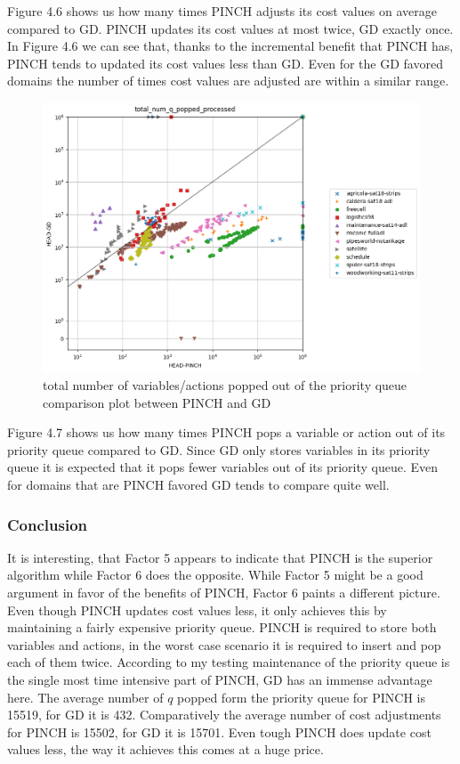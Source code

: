 Figure 4.6 shows us how many times PINCH adjusts its cost values on average compared to GD. PINCH updates its cost values at most twice, GD exactly once. In Figure 4.6 we can see that, thanks to the incremental benefit that PINCH has, PINCH tends to updated its cost values less than GD. Even for the GD favored domains the number of times cost values are adjusted are within a similar range.

\begin{figure}
    \centering
    \includegraphics[width=.7\columnwidth]{plotSearch.png}
    \caption{total number of variables/actions popped out of the priority queue comparison plot between PINCH and GD}
    \label{fig:my_label}
\end{figure}
Figure 4.7 shows us how many times PINCH pops a variable or action out of its priority queue compared to GD. Since GD only stores variables in its priority queue it is expected that it pops fewer variables out of its priority queue. Even for domains that are PINCH favored GD tends to compare quite well. 
\subsubsection{Conclusion}
It is interesting, that Factor 5 appears to indicate that PINCH is the superior algorithm while Factor 6 does the opposite. While Factor 5 might be a good argument in favor of the benefits of PINCH, Factor 6 paints a different picture. Even though PINCH updates cost values less, it only achieves this by maintaining a fairly expensive priority queue. PINCH is required to store both variables and actions, in the worst case scenario it is required to insert and pop each of them twice. According to my testing maintenance of the priority queue is the single most time intensive part of PINCH, GD has an immense advantage here. The average number of $q$ popped form the priority queue for PINCH is 15519, for GD it is 432. Comparatively the average number of cost adjustments for PINCH is 15502, for GD it is 15701. Even tough PINCH does update cost values less, the way it achieves this comes at a huge price.
